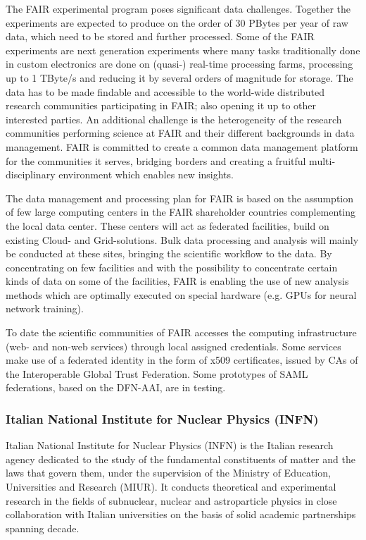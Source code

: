\documentclass[fleqn,11pt]{wlscirep}
\begin{document}
{The FAIR experimental program poses significant data challenges. Together the experiments are expected to produce on the order of 30 PBytes per year of raw data, which need to be stored and further processed. Some of the FAIR experiments are next generation experiments where many tasks traditionally done in custom electronics are done on (quasi-) real-time processing farms, processing up to 1 TByte/s and reducing it by several orders of magnitude for storage. The data has to be made findable and accessible to the world-wide distributed research communities participating in FAIR; also opening it up to other interested parties. An additional challenge is the heterogeneity of the research communities performing science at FAIR and their different backgrounds in data management. FAIR is committed to create a common data management platform for the communities it serves, bridging borders and creating a fruitful multi-disciplinary environment which enables new insights.
 
The data management and processing plan for FAIR is based on the assumption of few large computing centers in the FAIR shareholder countries complementing the local data center. These centers will act as federated facilities, build on existing Cloud- and Grid-solutions. Bulk data processing and analysis will mainly be conducted at these sites, bringing the scientific workflow to the data. By concentrating on few facilities and with the possibility to concentrate certain kinds of data on some of the facilities, FAIR is enabling the use of new analysis methods which are optimally executed on special hardware (e.g. GPUs for neural network training).
 
To date the scientific communities of FAIR accesses the computing infrastructure (web- and non-web services) through local assigned credentials. Some services make use of a federated identity in the form of x509 certificates, issued by CAs of the Interoperable Global Trust Federation. Some prototypes of SAML federations, based on the DFN-AAI, are in testing.

\subsubsection{Italian National Institute for Nuclear Physics (INFN)}
Italian National Institute for Nuclear Physics (INFN) is the Italian research agency dedicated to the study of the fundamental constituents of matter and the laws that govern them, under the supervision of the Ministry of Education, Universities and Research (MIUR). It conducts theoretical and experimental research in the fields of subnuclear, nuclear and astroparticle physics  in close collaboration with Italian universities on the basis of solid academic partnerships spanning decade.

}
\end{document}
